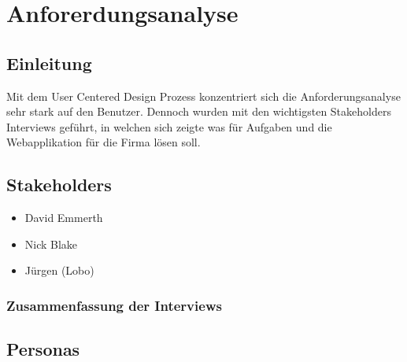 \chapter{Anforerdungsanalyse}
\label{sec:anforderungsanalyse}


\section{Einleitung}
Mit dem User Centered Design Prozess konzentriert sich die Anforderungsanalyse sehr stark auf den Benutzer. Dennoch wurden mit den wichtigsten Stakeholders Interviews geführt, in welchen sich zeigte was für Aufgaben und die Webapplikation für die Firma lösen soll.




\section{Stakeholders}
\begin{itemize}
	\item David Emmerth
	\item Nick Blake
	\item Jürgen (Lobo)
\end{itemize}

\subsection{Zusammenfassung der Interviews}

\section{Personas}
\label{sec:personas}

